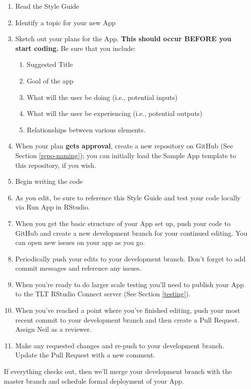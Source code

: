 \documentclass[
]{book}
\providecommand{\tightlist}{%
  \setlength{\itemsep}{0pt}\setlength{\parskip}{0pt}}
\begin{document}
\begin{enumerate}
\def\labelenumi{\arabic{enumi}.}
\tightlist
\item
  Read the Style Guide
\item
  Identify a topic for your new App
\item
  Sketch out your plans for the App. \textbf{This should occur BEFORE you start coding.} Be sure that you include:

  \begin{enumerate}
  \def\labelenumii{\alph{enumii}.}
  \tightlist
  \item
    Suggested Title
  \item
    Goal of the app
  \item
    What will the user be doing (i.e., potential inputs)
  \item
    What will the user be experiencing (i.e., potential outputs)
  \item
    Relationships between various elements.
  \end{enumerate}
\item
  When your plan \textbf{gets approval}, create a new repository on GitHub (See Section \ref{repo-naming}); you can initially load the Sample App template to this repository, if you wish.
\item
  Begin writing the code
\item
  As you edit, be sure to reference this Style Guide and test your code locally via Run App in RStudio.
\item
  When you get the basic structure of your App set up, push your code to GitHub and create a new development branch for your continued editing. You can open new issues on your app as you go.
\item
  Periodically push your edits to your development branch. Don't forget to add commit messages and reference any issues.
\item
  When you're ready to do larger scale testing you'll need to publish your App to the TLT RStudio Connect server (See Section \ref{testing}).
\item
  When you've reached a point where you've finished editing, push your most recent commit to your development branch and then create a Pull Request. Assign Neil as a reviewer.
\item
  Make any requested changes and re-push to your development branch. Update the Pull Request with a new comment.
\end{enumerate}

If everything checks out, then we'll merge your development branch with the master branch and schedule formal deployment of your App.
\end{document}
